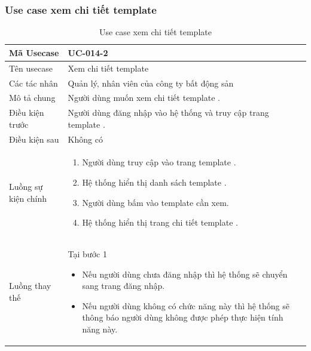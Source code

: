 \documentclass[12pt,a4paper]{article}
\begin{document}
    \subsubsection*{Use case xem chi tiết template  }
    \begin{table}[H]
        \centering
        \begin{tabular}{|p{3.5cm}|p{11.5cm}|c|}
            \hline
            Mã Usecase      & UC-014-2                                                       \\
            \hline
            Tên usecase     & Xem chi tiết template                                          \\
            \hline
            Các tác nhân    & Quản lý, nhân viên của công ty bất động sản                    \\
            \hline
            Mô tả chung     & Người dùng muốn xem chi tiết template .                        \\
            \hline

            Điều kiện trước & Người dùng đăng nhập vào hệ thống và truy cập trang template . \\
            \hline

            Điều kiện sau   & Không có                                                       \\
            \hline

            Luồng sự kiện chính & \vspace{-.8cm}\begin{enumerate}
                                                    \item Người dùng truy cập vào trang template .
                                                    \item Hệ thống hiển thị danh sách template .
                                                    \item Người dùng bấm vào template cần xem.
                                                    \item Hệ thống hiển thị trang chi tiết template .
            \end{enumerate}
            \\
            \hline
            Luồng thay thế & Tại bước 1\newline
            \vspace{-.8cm}\begin{itemize}
                              \item Nếu người dùng chưa đăng nhập thì hệ thống sẽ chuyển sang trang đăng nhập.
                              \item  Nếu người dùng không có chức năng này thì hệ thống sẽ thông báo người dùng không được phép thực hiện tính năng này.
            \end{itemize}

            \\    \hline
        \end{tabular}
        \caption{Use case xem chi tiết template  }
    \end{table}
\end{document}
